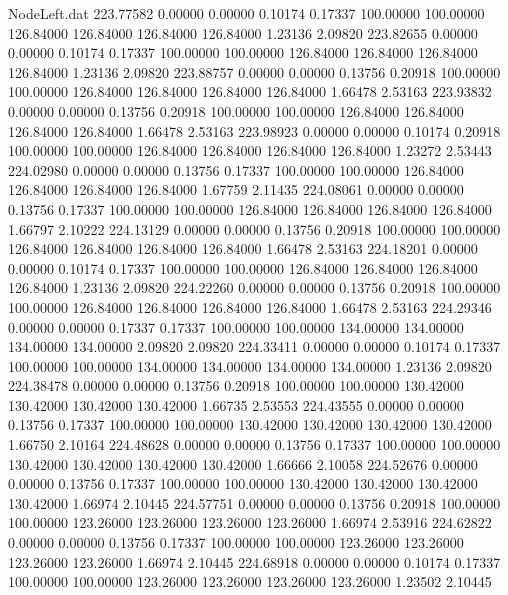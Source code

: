 \begin{filecontents}{NodeLeft.dat}
 223.77582    0.00000    0.00000     0.10174    0.17337  100.00000  100.00000  126.84000  126.84000  126.84000  126.84000    1.23136    2.09820
 223.82655    0.00000    0.00000     0.10174    0.17337  100.00000  100.00000  126.84000  126.84000  126.84000  126.84000    1.23136    2.09820
 223.88757    0.00000    0.00000     0.13756    0.20918  100.00000  100.00000  126.84000  126.84000  126.84000  126.84000    1.66478    2.53163
 223.93832    0.00000    0.00000     0.13756    0.20918  100.00000  100.00000  126.84000  126.84000  126.84000  126.84000    1.66478    2.53163
 223.98923    0.00000    0.00000     0.10174    0.20918  100.00000  100.00000  126.84000  126.84000  126.84000  126.84000    1.23272    2.53443
 224.02980    0.00000    0.00000     0.13756    0.17337  100.00000  100.00000  126.84000  126.84000  126.84000  126.84000    1.67759    2.11435
 224.08061    0.00000    0.00000     0.13756    0.17337  100.00000  100.00000  126.84000  126.84000  126.84000  126.84000    1.66797    2.10222
 224.13129    0.00000    0.00000     0.13756    0.20918  100.00000  100.00000  126.84000  126.84000  126.84000  126.84000    1.66478    2.53163
 224.18201    0.00000    0.00000     0.10174    0.17337  100.00000  100.00000  126.84000  126.84000  126.84000  126.84000    1.23136    2.09820
 224.22260    0.00000    0.00000     0.13756    0.20918  100.00000  100.00000  126.84000  126.84000  126.84000  126.84000    1.66478    2.53163
 224.29346    0.00000    0.00000     0.17337    0.17337  100.00000  100.00000  134.00000  134.00000  134.00000  134.00000    2.09820    2.09820
 224.33411    0.00000    0.00000     0.10174    0.17337  100.00000  100.00000  134.00000  134.00000  134.00000  134.00000    1.23136    2.09820
 224.38478    0.00000    0.00000     0.13756    0.20918  100.00000  100.00000  130.42000  130.42000  130.42000  130.42000    1.66735    2.53553
 224.43555    0.00000    0.00000     0.13756    0.17337  100.00000  100.00000  130.42000  130.42000  130.42000  130.42000    1.66750    2.10164
 224.48628    0.00000    0.00000     0.13756    0.17337  100.00000  100.00000  130.42000  130.42000  130.42000  130.42000    1.66666    2.10058
 224.52676    0.00000    0.00000     0.13756    0.17337  100.00000  100.00000  130.42000  130.42000  130.42000  130.42000    1.66974    2.10445
 224.57751    0.00000    0.00000     0.13756    0.20918  100.00000  100.00000  123.26000  123.26000  123.26000  123.26000    1.66974    2.53916
 224.62822    0.00000    0.00000     0.13756    0.17337  100.00000  100.00000  123.26000  123.26000  123.26000  123.26000    1.66974    2.10445
 224.68918    0.00000    0.00000     0.10174    0.17337  100.00000  100.00000  123.26000  123.26000  123.26000  123.26000    1.23502    2.10445

\end{filecontents}
